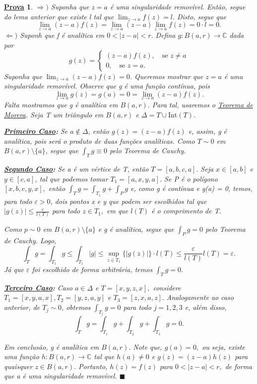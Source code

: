 \documentclass{article}
\newtheorem*{proof*}{\underline{Prova}}
\renewcommand\qedsymbol{$\blacksquare$}
\begin{document}
  \begin{proof*}
    \(\Rightarrow )\) Suponha que \(z=a\) é uma singularidade removível. Então, segue do lema anterior que existe l tal que \(\lim_{z\to a}f(z) = l.\) Disto, segue que 
    \[
      \lim_{z\to a}(z-a)f(z) = \lim_{z\to a}(z-a)\lim_{z\to a}f(z) = 0 \cdot l = 0.
    \]
    \(\Leftarrow )\) Suponh que f é analítica em \(0 < |z-a| < r.\) Defina \(g:B(a, r)\rightarrow \mathbb{C}\) dada por 
    \[
      g(z) = \left\{\begin{array}{ll}
          (z-a)f(z),\quad \text{se }z\neq a\\
          0,\quad \text{se }z=a.
      \end{array}\right.
    \]
    Suponha que \(\lim_{z\to a}(z-a)f(z) = 0\). Queremos mostrar que \(z = a\) é uma singularidade removível.
    Observe que g é uma função contínua, pois 
    \[
      \lim_{z\to a}g(z) = g(a) = 0 = \lim_{z\to a}(z-a)f(z).
    \]
    Falta mostramos que g é analítica em \(B(a, r)\). Para tal, usaremos o \hyperlink{morera}{Teorema de Morera}.
    Seja T um triângulo em \(B(a, r)\) e \(\Delta = T\cup \mathrm{Int}(T)\).

    \textbf{\underline{Primeiro Caso}:} Se \(a\not\in \Delta \), então \(g(z) = (z-a)f(z)\) e, assim, g é analítica, pois 
    será o produto de duas funções analíticas. Como \(T\sim 0\) em \(B(a, r)\setminus{\{a\}}\), segue que \(\int_{T}^{}g\equiv 0\) pelo 
    Teorema de Cauchy.

    \textbf{\underline{Segundo Caso}:} Se a é um vértice de T, então \(T = [a, b, c, a].\) Seja \(x\in [a, b]\) e \(y\in [c, a]\), tal que
    podemos tomar \(T_{1} = [a, x, y, a].\) Se P é o polígono \([x, b, c, y, x],\) então \(\int_{T}^{}g = \int_{T_{1}}^{}g + \int_{P}^{}g\) e, como g
    é contínua e g(a) = 0, temos, para todo \(\varepsilon > 0\), dois pontos x e y que podem ser escolhidos tal que \(|g(z)| \leq \frac{\varepsilon }{l(T)}\) 
    para todo \(z\in T_{1},\) em que \(l(T)\) é o comprimento de T.

    Como \(p\sim 0\) em \(B(a, r)\setminus{\{a\}}\) e g é analítica, segue que \(\int_{P}^{}g = 0\) pelo Teorema de Cauchy. Logo, 
    \[
      \int_{T}^{}g = \int_{T_{1}}^{} g \leq \int_{T_{1}}^{}|g| \leq \sup_{z\in T_{1}}\{|g(z)|\}\cdot l(T) \leq \frac{\varepsilon }{l(T)}l(T) = \varepsilon .
    \]
    Já que \(\varepsilon \) foi escolhido de forma arbitrária, temos \(\int_{T}^{}g = 0.\)

    \textbf{\underline{Terceiro Caso}:} Caso \(a\in \Delta \) e \(T = [x, y, z, x],\) considere \(T_{1} = [x, y, a, x], T_{2} = [y, z, a, y]\) e \(T_{3} = [z, x, a, z].\)
    Analogamente ao caso anterior, de \(T_{j}\sim 0\), obtemos \(\int_{T_{j}}^{}g = 0\) para todo \(j = 1, 2, 3\) e, além disso, 
    \[
      \int_{T}^{}g = \int_{T_{1}}^{}g + \int_{T_{2}}^{} g + \int_{T_{3}}^{}g = 0.
    \]

    Em conclusão, g é analítica em \(B(a, r).\) Note que, \(g(a) = 0,\) ou seja, existe uma função \(h:B(a, r)\rightarrow \mathbb{C}\) tal que \(h(a)\neq0\) e \(g(z) = (z-a)h(z)\)
    para quaisquer \(z\in B(a, r).\) Portanto, \(h(z) = f(z)\) para \(0 < |z-a| < r,\) de forma que a é uma singularidade removível. \qedsymbol
  \end{proof*}
\end{document}
